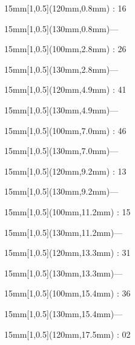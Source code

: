 \documentclass[a4paper]{memoir}
\begin{document}
\begin{textblock*}{15mm}[1,0.5](120mm,0.8mm) : 16\end{textblock*}
\begin{textblock*}{15mm}[1,0.5](130mm,0.8mm)\flushright —\end{textblock*}
\begin{textblock*}{15mm}[1,0.5](100mm,2.8mm) : 26\end{textblock*}
\begin{textblock*}{15mm}[1,0.5](130mm,2.8mm)\flushright —\end{textblock*}
\begin{textblock*}{15mm}[1,0.5](120mm,4.9mm) : 41\end{textblock*}
\begin{textblock*}{15mm}[1,0.5](130mm,4.9mm)\flushright —\end{textblock*}
\begin{textblock*}{15mm}[1,0.5](100mm,7.0mm) : 46\end{textblock*}
\begin{textblock*}{15mm}[1,0.5](130mm,7.0mm)\flushright —\end{textblock*}
\begin{textblock*}{15mm}[1,0.5](120mm,9.2mm) : 13\end{textblock*}
\begin{textblock*}{15mm}[1,0.5](130mm,9.2mm)\flushright —\end{textblock*}
\begin{textblock*}{15mm}[1,0.5](100mm,11.2mm) : 15\end{textblock*}
\begin{textblock*}{15mm}[1,0.5](130mm,11.2mm)\flushright —\end{textblock*}
\begin{textblock*}{15mm}[1,0.5](120mm,13.3mm) : 31\end{textblock*}
\begin{textblock*}{15mm}[1,0.5](130mm,13.3mm)\flushright —\end{textblock*}
\begin{textblock*}{15mm}[1,0.5](100mm,15.4mm) : 36\end{textblock*}
\begin{textblock*}{15mm}[1,0.5](130mm,15.4mm)\flushright —\end{textblock*}
\begin{textblock*}{15mm}[1,0.5](120mm,17.5mm) : 02\end{textblock*}
\end{document}
